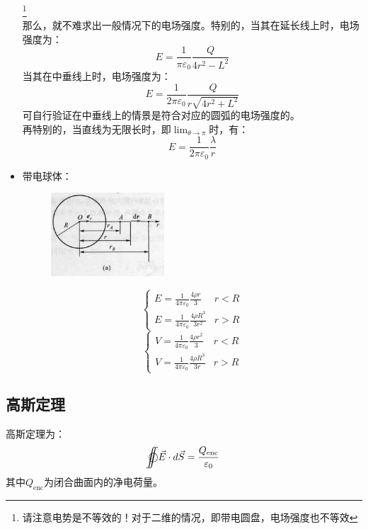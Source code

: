 \documentclass{ctexart}
\def\ooint{{\bigcirc}\kern-12.5pt{\int}\kern-7.5pt{\int}}
\begin{document}
\begin{itemize}
    \footnote{请注意电势是不等效的！对于二维的情况，即带电圆盘，电场强度也不等效} \\
    那么，就不难求出一般情况下的电场强度。特别的，当其在延长线上时，电场强度为：
    $$
        E = \frac{1}{\pi \varepsilon_0} \frac{Q}{4r^2 - L^2}
    $$
    当其在中垂线上时，电场强度为：
    $$
        E = \frac{1}{2\pi \varepsilon_0} \frac{Q}{r\sqrt{4r^2 + L^2}}
    $$
    可自行验证在中垂线上的情景是符合对应的圆弧的电场强度的。\\
    再特别的，当直线为无限长时，即$\lim_{\theta \to \pi}$时，有：
    $$
        E = \frac{1}{2\pi \varepsilon_0} \frac{\lambda}{r}
    $$
    \item 带电球体：
    \begin{figure}[H]
        \centering
        \includegraphics[width=0.4\textwidth]{img/5-31.jpg}
    \end{figure}
    \begin{equation*}
        \begin{cases}
            E = \frac{1}{4\pi \varepsilon_0} \frac{4 \rho r}{3} & r < R \\
            E = \frac{1}{4\pi \varepsilon_0} \frac{4 \rho R^3}{3r^2} & r > R
        \end{cases}
    \end{equation*}
    \begin{equation*}
        \begin{cases}
            V = \frac{1}{4\pi \varepsilon_0} \frac{4 \rho r^2}{3} & r < R \\
            V = \frac{1}{4\pi \varepsilon_0} \frac{4 \rho R^3}{3r} & r > R
        \end{cases}
    \end{equation*}
\end{itemize}
\subsection{高斯定理}
高斯定理为：
$$
    \ooint \vec{E} \cdot d\vec{S} = \frac{Q_{\text{enc}}}{\varepsilon_0}
$$
其中$Q_{\text{enc}}$为闭合曲面内的净电荷量。
\end{document}
